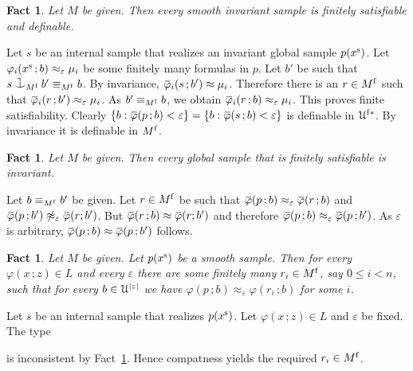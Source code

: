 \documentclass[10pt,openany]{article}
\newcommand{\sbar}[1]{\mkern 1.8mu\overline{\mkern-1.8mu#1\mkern-1mu}\mkern 1mu}
\def\cnonfork{\mathbin{\raise1.8ex\rlap{\kern0.6ex\rule{0.6ex}{0.1ex}}
\rlap{\kern1.1ex\rule{0.1ex}{1.9ex}}\raise-0.3ex\hbox{$\smile$} } }
\def\U{\EuScript U}
\def\phi{\varphi}
\def\epsilon{\varepsilon}
\newcounter{thm}[section]
\theoremstyle{mio}
\newtheorem{fact}[thm]{Fact}
\theoremstyle{liscio}
\def\QED{\noindent\nolinebreak[4]\hspace{\stretch{1}}\rlap{\ \ $\Box$}\medskip}
\renewenvironment{proof}[1][Proof]%
{\begin{trivlist}\item[\hskip\labelsep {\bf #1}]}
{\QED\end{trivlist}}
\begin{document}
\begin{fact}\label{fact_smooth=>fs}
  Let $M$ be given. Then every smooth invariant sample is finitely satisfiable and definable.
\end{fact}

\begin{proof}
  Let $s$ be an internal sample that realizes an invariant global sample $p(x^{\rm s})$.
  Let $\phi_i(x^{\rm s}\,;b)\approx_\epsilon\mu_i$ be some finitely many formulas in $p$.
  Let $b'$ be such that $s\cnonfork_{M^{\rm f}}b'\equiv_{M^{\rm f}}b$.
  By invariance, $\sbar\phi_i(s\,;b')\approx\mu_i$. 
  Therefore there is an $r\in M^{\rm f}$ such that $\sbar\phi_i(r\,;b')\approx_\epsilon\mu_i$.
  As $b'\equiv_{M^{\rm f}}b$, we obtain $\sbar\phi_i(r\,;b)\approx_\epsilon\mu_i$.
  This proves finite satisfiability.
  Clearly $\{b:\sbar\phi(p\,;b)<\epsilon\}=\{b:\sbar\phi(s\,;b)<\epsilon\}$ is definable in $\U^{\rm f*}$. By invariance it is definable in $M^{\rm f}$. 
\end{proof}

\begin{fact}
  Let $M$ be given. Then every global sample that is finitely satisfiable is invariant.
\end{fact}

\begin{proof}
  Let $b\equiv_{M^{\rm f}}b'$ be given.
  Let $r\in M^{\rm f}$ be such that $\sbar\phi(p\,;b)\approx_\epsilon\sbar\phi(r\,;b)$ and $\sbar\phi(p\,;b')\not\approx_\epsilon\sbar\phi(r;b')$.
  But $\sbar\phi(r\,;b)\approx\sbar\phi(r;b')$ and therefore $\sbar\phi(p\,;b)\approx_\epsilon\sbar\phi(p\,;b')$.
  As $\epsilon$ is arbitrary,  $\sbar\phi(p\,;b)\approx\sbar\phi(p\,;b')$ follows.
\end{proof}


\begin{fact}
  Let $M$ be given.
  Let $p(x^{\rm s})$ be a smooth sample.
  Then for every $\phi(x\,;z)\in L$ and every $\epsilon$ there are some finitely many $r_i\in M^{\rm f}$, say $0\le i<n$, such that for every $b\in\U^{|z|}$ we have $\phi(p\,;b)\approx_\epsilon\phi(r_i\,;b)$ for some $i$.
\end{fact}

\begin{proof}
  Let $s$ be an internal sample that realizes $p(x^{\rm s})$.
  Let $\phi(x\,;z)\in L$ and $\epsilon$ be fixed.
  The type

  \ceq{\hfill p(z)}{=}{\Big\{\sbar\phi(s\,;z)\not\approx_\epsilon\sbar\phi(r\,;z)\ :\ r\in M^{\rm f}\Big\}}
  
  is inconsistent by Fact~\ref{fact_smooth=>fs}.
  Hence compatness yields the required $r_i\in M^{\rm f}$.
\end{proof}
\end{document}
